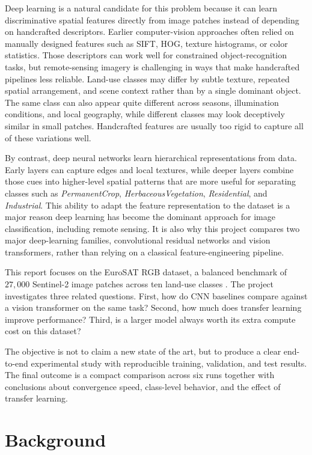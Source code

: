 \documentclass[11pt]{report}
\begin{document}
Deep learning is a natural candidate for this problem because it can learn discriminative spatial features directly from image patches instead of depending on handcrafted descriptors. Earlier computer-vision approaches often relied on manually designed features such as SIFT, HOG, texture histograms, or color statistics. Those descriptors can work well for constrained object-recognition tasks, but remote-sensing imagery is challenging in ways that make handcrafted pipelines less reliable. Land-use classes may differ by subtle texture, repeated spatial arrangement, and scene context rather than by a single dominant object. The same class can also appear quite different across seasons, illumination conditions, and local geography, while different classes may look deceptively similar in small patches. Handcrafted features are usually too rigid to capture all of these variations well.

By contrast, deep neural networks learn hierarchical representations from data. Early layers can capture edges and local textures, while deeper layers combine those cues into higher-level spatial patterns that are more useful for separating classes such as \textit{PermanentCrop}, \textit{HerbaceousVegetation}, \textit{Residential}, and \textit{Industrial}. This ability to adapt the feature representation to the dataset is a major reason deep learning has become the dominant approach for image classification, including remote sensing. It is also why this project compares two major deep-learning families, convolutional residual networks and vision transformers, rather than relying on a classical feature-engineering pipeline.

This report focuses on the EuroSAT RGB dataset, a balanced benchmark of \(27{,}000\) Sentinel-2 image patches across ten land-use classes \cite{helber2019}. The project investigates three related questions. First, how do CNN baselines compare against a vision transformer on the same task? Second, how much does transfer learning improve performance? Third, is a larger model always worth its extra compute cost on this dataset?

The objective is not to claim a new state of the art, but to produce a clear end-to-end experimental study with reproducible training, validation, and test results. The final outcome is a compact comparison across six runs together with conclusions about convergence speed, class-level behavior, and the effect of transfer learning.

\chapter{Background}
\end{document}
